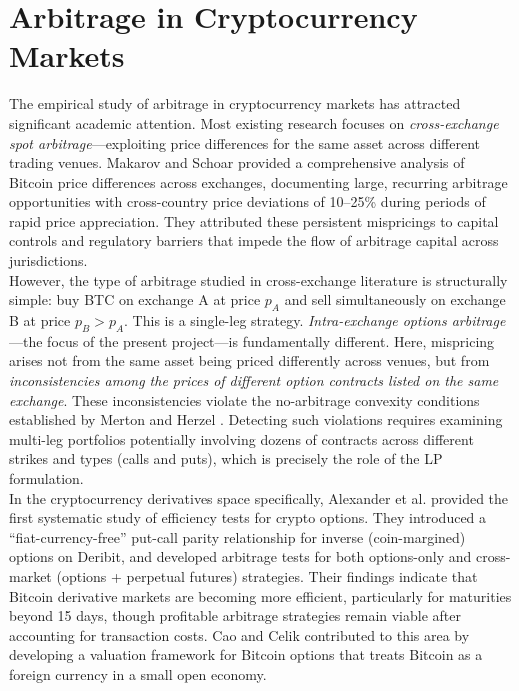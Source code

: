 \documentclass[openany]{book}
\numberwithin{figure}{chapter}
\numberwithin{equation}{chapter}
\begin{document}
\section{Arbitrage in Cryptocurrency Markets}

The empirical study of arbitrage in cryptocurrency markets has attracted significant academic attention. Most existing research focuses on \textit{cross-exchange spot arbitrage}---exploiting price differences for the same asset across different trading venues. Makarov and Schoar \cite{makarov2020} provided a comprehensive analysis of Bitcoin price differences across exchanges, documenting large, recurring arbitrage opportunities with cross-country price deviations of 10--25\% during periods of rapid price appreciation. They attributed these persistent mispricings to capital controls and regulatory barriers that impede the flow of arbitrage capital across jurisdictions.\\

However, the type of arbitrage studied in cross-exchange literature is structurally simple: buy BTC on exchange A at price $p_A$ and sell simultaneously on exchange B at price $p_B > p_A$. This is a single-leg strategy. \textit{Intra-exchange options arbitrage}---the focus of the present project---is fundamentally different. Here, mispricing arises not from the same asset being priced differently across venues, but from \textit{inconsistencies among the prices of different option contracts listed on the same exchange}. These inconsistencies violate the no-arbitrage convexity conditions established by Merton \cite{merton1973} and Herzel \cite{herzel2005}. Detecting such violations requires examining multi-leg portfolios potentially involving dozens of contracts across different strikes and types (calls and puts), which is precisely the role of the LP formulation.\\

In the cryptocurrency derivatives space specifically, Alexander et al. \cite{alexander2024} provided the first systematic study of efficiency tests for crypto options. They introduced a ``fiat-currency-free'' put-call parity relationship for inverse (coin-margined) options on Deribit, and developed arbitrage tests for both options-only and cross-market (options + perpetual futures) strategies. Their findings indicate that Bitcoin derivative markets are becoming more efficient, particularly for maturities beyond 15 days, though profitable arbitrage strategies remain viable after accounting for transaction costs. Cao and Celik \cite{cao2021} contributed to this area by developing a valuation framework for Bitcoin options that treats Bitcoin as a foreign currency in a small open economy.\\
\end{document}
